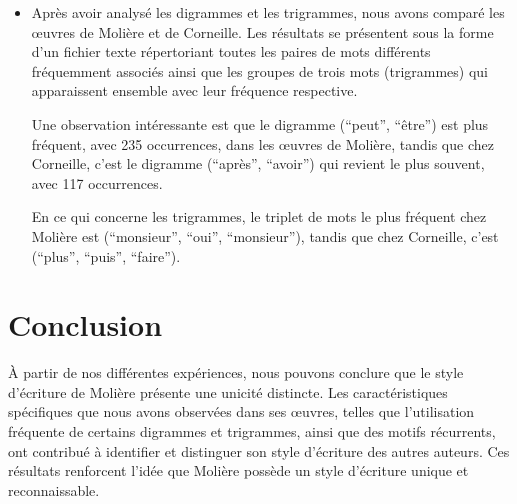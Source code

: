 \documentclass[]{report}
\begin{document}
\begin{itemize}
\item Après avoir analysé les digrammes et les trigrammes, nous avons comparé
les œuvres de Molière et de Corneille. Les résultats se présentent sous la forme
d'un fichier texte répertoriant toutes les paires de mots différents fréquemment
associés ainsi que les groupes de trois mots (trigrammes) qui apparaissent
ensemble avec leur fréquence respective.
	
Une observation intéressante est que le digramme (``peut'', ``être'') est plus
fréquent, avec 235 occurrences, dans les œuvres de Molière, tandis que chez
Corneille, c'est le digramme (``après'', ``avoir'') qui revient le plus souvent,
avec 117 occurrences.
	
En ce qui concerne les trigrammes, le triplet de mots le plus fréquent chez
Molière est (``monsieur'', ``oui'', ``monsieur''), tandis que chez Corneille,
c'est (``plus'', ``puis'', ``faire'').
	
\end{itemize}
\section{Conclusion}
\vspace{\baselineskip}
\hspace{0,5cm} À partir de nos différentes expériences, nous pouvons conclure
que le style d'écriture de Molière présente une unicité distincte. Les
caractéristiques spécifiques que nous avons observées dans ses œuvres, telles
que l'utilisation fréquente de certains digrammes et trigrammes, ainsi que des
motifs récurrents, ont contribué à identifier et distinguer son style d'écriture
des autres auteurs. Ces résultats renforcent l'idée que Molière possède un style
d'écriture unique et reconnaissable.
\end{document}

